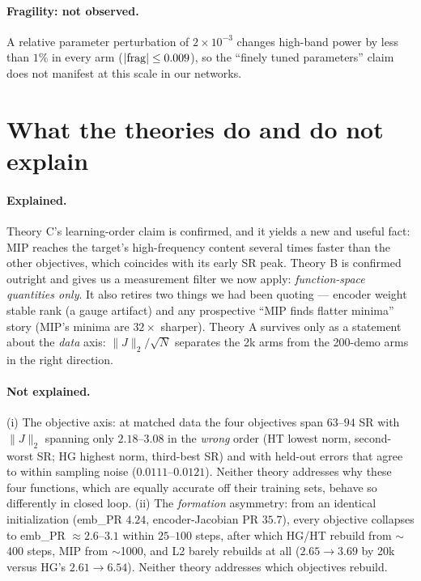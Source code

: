 \documentclass[10pt]{article}
\begin{document}
\paragraph{Fragility: not observed.} A relative parameter perturbation of
$2\times10^{-3}$ changes high-band power by less than $1\%$ in every arm
($|{\rm frag}| \le 0.009$), so the ``finely tuned parameters'' claim does
not manifest at this scale in our networks.

\section{What the theories do and do not explain}

\paragraph{Explained.} Theory C's learning-order claim is confirmed, and
it yields a new and useful fact: MIP reaches the target's high-frequency
content several times faster than the other objectives, which coincides
with its early SR peak. Theory B is confirmed outright and gives us a
measurement filter we now apply: \emph{function-space quantities only}.
It also retires two things we had been quoting --- encoder weight stable
rank (a gauge artifact) and any prospective ``MIP finds flatter minima''
story (MIP's minima are $32\times$ sharper). Theory A survives only as a
statement about the \emph{data} axis: $\|J\|_2/\sqrt N$ separates the 2k
arms from the 200-demo arms in the right direction.

\paragraph{Not explained.} (i) The objective axis: at matched data the
four objectives span $63$--$94$ SR with $\|J\|_2$ spanning only
$2.18$--$3.08$ in the \emph{wrong} order (HT lowest norm, second-worst
SR; HG highest norm, third-best SR) and with held-out errors that agree
to within sampling noise ($0.0111$--$0.0121$). Neither theory addresses
why these four functions, which are equally accurate off their training
sets, behave so differently in closed loop. (ii) The \emph{formation} asymmetry: from an
identical initialization (emb\_PR $4.24$, encoder-Jacobian PR $35.7$),
every objective collapses to emb\_PR $\approx2.6$--$3.1$ within
$25$--$100$ steps, after which HG/HT rebuild from $\sim$400 steps, MIP
from $\sim$1000, and L2 barely rebuilds at all
($2.65\!\to\!3.69$ by 20k versus HG's $2.61\!\to\!6.54$). Neither theory
addresses which objectives rebuild.
\end{document}
